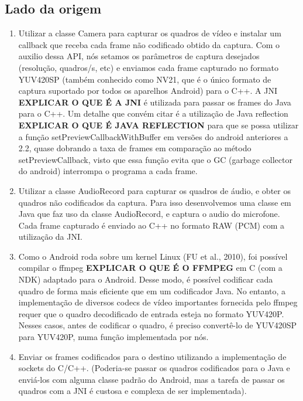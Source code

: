 \documentclass{acm_proc_article-sp}
\newcommand{\todo}[1]{\textcolor[rgb]{1.00,0.00,0.00}{\bf \uppercase{#1}}}
\begin{document}
\subsection{Lado da origem}
\begin{enumerate}
 \item Utilizar a classe Camera para capturar os quadros de vídeo e instalar um callback que receba cada frame não codificado obtido da captura. Com o auxilio dessa API, nós setamos os parâmetros de captura desejados (resolução, quadros/s, etc) e enviamos cada frame capturado no formato YUV420SP (também conhecido como NV21, que é o único formato de captura suportado por todos os aparelhos Android) para o C++. A JNI \todo{explicar o que é a JNI} é utilizada para passar os frames do Java para o C++.
Um detalhe que convém citar é a utilização de Java reflection \todo{explicar o que é java reflection} para que se possa utilizar a função setPreviewCallbackWithBuffer em versões do android anteriores a 2.2, quase dobrando a taxa de frames em comparação ao método setPreviewCallback, visto que essa função evita que o GC (garbage collector do android) interrompa o programa a cada frame.
 \item Utilizar a classe AudioRecord para capturar os quadros de áudio, e obter os quadros não codificados da captura. Para isso desenvolvemos uma classe em Java que faz uso da classe AudioRecord, e captura o audio do microfone. Cada frame capturado é enviado ao C++ no formato RAW (PCM) com a utilização da JNI.
 \item Como o Android roda sobre um kernel Linux (FU et al., 2010), foi possível compilar o ffmpeg \todo{explicar o que é o ffmpeg} em C (com a NDK) adaptado para o Android. Desse modo, é possível codificar cada quadro de forma mais eficiente que em um codificador Java. No entanto, a implementação de diversos codecs de vídeo importantes fornecida pelo ffmpeg requer que o quadro decodificado de entrada esteja no formato YUV420P. Nesses casos, antes de codificar o quadro, é preciso convertê-lo de YUV420SP para YUV420P, numa função implementada por nós.
 \item Enviar os frames codificados para o destino utilizando a implementação de sockets do C/C++. (Poderia-se passar os quadros codificados para o Java e enviá-los com alguma classe padrão do Android, mas a tarefa de passar os quadros com a JNI é custosa e complexa de ser implementada).
\end{enumerate}
\end{document}
